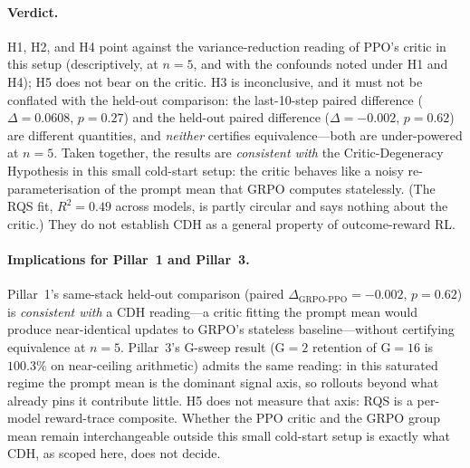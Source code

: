 \paragraph{Verdict.}
H1, H2, and H4 point against the variance-reduction reading of
PPO's critic in this setup (descriptively, at $n{=}5$, and with
the confounds noted under H1 and H4); H5 does not bear on the critic. H3 is inconclusive, and it must not be conflated
with the held-out comparison: the last-10-step paired difference
($\Delta{=}0.0608$, $p{=}0.27$) and the held-out paired
difference ($\Delta{=}{-}0.002$, $p{=}0.62$) are different
quantities, and \emph{neither} certifies equivalence---both are
under-powered at $n{=}5$. Taken together, the results are
\emph{consistent with} the Critic-Degeneracy Hypothesis in this
small cold-start setup: the critic behaves like a noisy
re-parameterisation of the prompt mean that GRPO computes
statelessly. (The RQS fit, $R^2{=}0.49$ across models, is partly circular and
says nothing about the critic.) They do not establish CDH as a general property of
outcome-reward RL.

\paragraph{Implications for Pillar~1 and Pillar~3.}
Pillar~1's same-stack held-out comparison (paired
$\Delta_{\text{GRPO-PPO}} = -0.002$, $p{=}0.62$) is
\emph{consistent with} a CDH reading---a critic fitting the
prompt mean would produce near-identical updates to GRPO's
stateless baseline---without certifying equivalence at $n{=}5$.
Pillar~3's G-sweep result (G${=}2$ retention of G${=}16$ is
$100.3\%$ on near-ceiling arithmetic) admits the same reading:
in this saturated regime the prompt mean is the dominant signal
axis, so rollouts beyond what already pins it contribute little.
H5 does not measure that axis: RQS is a per-model reward-trace
composite. Whether the PPO critic and the GRPO group mean remain
interchangeable outside this small cold-start setup is exactly
what CDH, as scoped here, does not decide.